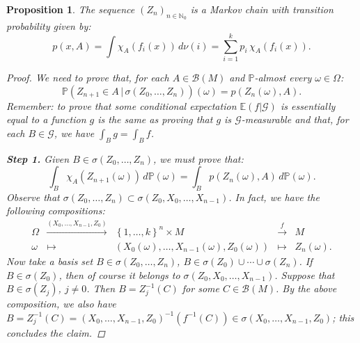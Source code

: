 \documentclass[a4paper]{article}
\theoremstyle{plain}
\newtheorem{prop} [theorem]{Proposition}
\theoremstyle{definition}
\newcommand{\N}{\mathbb{N}}
\begin{document}
	\begin{prop}
		The sequence $(Z_{n})_{n\in\N_{0}}$ is a Markov chain with transition probability given by:
		\begin{equation*}
			p(x,A) = \int\chi_{A}(f_{i}(x))\,d\nu(i) = \sum_{i=1}^{k}p_{i}\,\chi_{A}(f_{i}(x)).
		\end{equation*}
		\begin{proof}
			We need to prove that, for each $A \in \mathcal{B}(M)$ and $\mathbb{P}$-almost every $\omega \in \Omega$:
			\begin{equation*}
				\mathbb{P}\left(Z_{n+1} \in A \,|\, \sigma(Z_{0},\dots,Z_{n})\right)(\omega) = p(Z_{n}(\omega),A).
			\end{equation*}
			Remember: to prove that some conditional expectation $\mathbb{E}(f|\mathcal{G})$ is essentially equal to a function $g$ is the same as proving that $g$ is $\mathcal{G}$-measurable and that, for each $B \in \mathcal{G}$, we have $\int_{B}g = \int_{B}f$.
			
			\noindent\textbf{Step 1.} Given $B \in \sigma(Z_{0},\dots,Z_{n})$, we must prove that:
			\begin{equation}\label{formula 1 prop 3.1}
				\int_{B}\chi_{A}(Z_{n+1}(\omega))\,d\mathbb{P}(\omega) = \int_{B}p(Z_{n}(\omega),A)\,d\mathbb{P}(\omega).
			\end{equation}
			Observe that $\sigma(Z_{0},\dots,Z_{n}) \subset \sigma(Z_{0},X_{0},\dots,X_{n-1})$. In fact, we have the following compositions:
            \begin{equation*}
                \begin{array}{ccccc}
                    \Omega & \stackrel{(X_{0},\dots,X_{n-1},Z_{0})}{\longrightarrow} & \left\{1,\dots,k\right\}^{n} \times M & \stackrel{f}{\longrightarrow} & M \\
                    \omega & \longmapsto & \left(X_{0}(\omega),\dots,X_{n-1}(\omega),Z_{0}(\omega)\right) & \longmapsto & Z_{n}(\omega).
                \end{array}
            \end{equation*}
            Now take a basis set $B \in \sigma(Z_{0},\dots,Z_{n})$, $B \in \sigma(Z_{0})\cup\cdots\cup\sigma(Z_{n})$. If $B \in \sigma(Z_{0})$, then of course it belongs to $\sigma(Z_{0},X_{0},\dots,X_{n-1})$. Suppose that $B \in \sigma(Z_{j})$, $j \neq 0$. Then $B = Z_{j}^{-1}(C)$ for some $C \in \mathcal{B}(M)$. By the above composition, we also have $B = Z_{j}^{-1}(C) = (X_{0},\dots,X_{n-1},Z_{0})^{-1}(f^{-1}(C)) \in \sigma(X_{0},\dots,X_{n-1},Z_{0})$; this concludes the claim.
   

\end{proof}
\end{prop}
\end{document}
